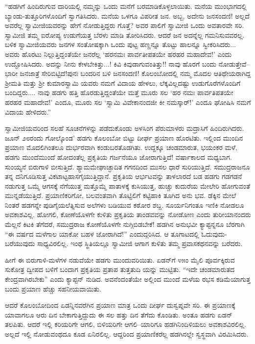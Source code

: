 “ಹಡಗಿಗೆ ಹಿಂದಿರುಗುವ ದಾರಿಯಲ್ಲಿ ನಮ್ಮನ್ನು ಒಂದು ಮನೆಗೆ ಬರಮಾಡಿಕೊಳ್ಳಲಾಯಿತು. ಮನೆಯ ಮುಂಭಾಗದಲ್ಲಿ ಬ್ಯಾಂಡು-ತುತ್ತೂರಿಗಳೊಂದಿಗೆ ಸ್ವಾಗತಿಸಿದರು. ಮನೆಯ ಒಳಗೂ ವಿಪರೀತ ಜನ. ಅಬ್ಬ, ಅದೇನು ಜನಸಂದಣಿ! ಅಲ್ಲದೆ ಅವರೆಲ್ಲ ಸ್ವಾಮೀಜಿಯವರನ್ನು ಹೇಗೆ ನೋಡುತ್ತಿದ್ದರು ಗೊತ್ತೆ? ಅವರ ಪಾಲಿಗೆ ಸ್ವಾಮೀಜಿ ಒಂದು ಅವತಾರವೇ ಸರಿ. ಸ್ವಾಮೀಜಿ ತಮ್ಮ ಐರೋಪ್ಯ ಉಡುಗೆಯತ್ತ ಬೆರಳು ಮಾಡಿ ತೋರಿಸಿದರು. ಆದರೆ ಜನ ಅದನ್ನೆಲ್ಲ ಗಮನಿಸುವವರಲ್ಲ. ಬಳಿಕ ಸ್ವಾಮೀಜಿಯವರು ಜನಗಳ ಸಂತೋಷಕ್ಕಾಗಿ ಒಂದು ಪುಟ್ಟ ಹಣ್ಣನ್ನೂ ತೊಟ್ಟು ಹಾಲನ್ನೂ ಸ್ವೀಕರಿಸಿದರು... ಅವರು ಹೊರಟು ನಿಲ್ಲುತ್ತಿದ್ದಂತೆಯೇ ಜನರೆಲ್ಲ ‘ಹರನಮಃ ಪಾರ್ವತೀಪತಯೇ ಹರಹರ ಮಹಾದೇವ!’ ಎಂದು ಉದ್ಘೋಷಿಸಿದರು. ಅದನ್ನು ನೀನು ಕೇಳಬೇಕಿತ್ತು...! ಕಿವಿ ಕಿವುಡಾಗುವಂತಿತ್ತು!! ನಾವು ಹೊರಗೆ ಬಂದು ನೋಡುತ್ತೇವೆ–ಭಾರೀ ಜನಜಾತ್ರೆ ಸೇರಿಬಿಟ್ಟಿದೆ!ಪುನಃ ಬಂದರಿನ ಬಳಿ ಜನಸಂದಣಿ! ಕೊಲಂಬೋದಲ್ಲಿ ನಮ್ಮ ಮೊದಲ ಆತಿಥೇಯರಾಗಿದ್ದ ಶ್ರೀಮತಿ ಮತ್ತು ಶ್ರೀ ಕುಮಾರಸ್ವಾಮಿ ಯವರು ನಮಗೆ ವಿದಾಯ ಹೇಳಲು, ಲೆಕ್ಕವಿಲ್ಲದಷ್ಟು ಉಡುಗೊರೆಗಳೊಂದಿಗೆ ಬಂದಿದ್ದರು.... ನಾವು ಹಡಗು ಹತ್ತಿ ಹೊರಡುತ್ತಿದ್ದಂತೆಯೇ ಮತ್ತೆ ಮೂರು ಸಲ ‘ಹರ ನಮಃ ಪಾರ್ವತಿಪತಯೇ ಹರಹರ ಮಹಾದೇವ!’ ಎಂದೂ, ಮೂರು ಸಲ ‘ಸ್ವಾಮಿ ವಿವೇಕಾನಂದಜೀ ಕೀ ನಮಸ್ಕಾರ್​!’ ಎಂದೂ ಘೋಷಿಸಿ ನಮಗೆ ವಿದಾಯ ಹೇಳಿದರು.”

ಸ್ವಾಮೀಜಿಯವರಿಂದ ಸಲಹೆ ಸೂಚನೆಗಳನ್ನು ಪಡೆದುಕೊಂಡು ಅಳಸಿಂಗ ಪೆರುಮಾಳರು ಮದ್ರಾಸಿಗೆ ಹಿಂದಿರುಗಿದರು. ಜೂನ್ ೨೮ರಂದು ಗೋಲ್ಕೊಂಡ’ ಹಡಗು ಕೊಲಂಬೋ ಬಿಟ್ಟು ದೀರ್ಘ ಪ್ರಯಾಣ ಹೊರಟಿತು. ಇಲ್ಲಿಂದ ಮುಂದಿನ ಪ್ರಯಾಣ ಮೊದಲಿಗಿಂತಲೂ ದುರ್ಭರವಾಗಿ ಕಂಡುಬರತೊಡಗಿತು. ಉದ್ದಕ್ಕೂ ಚಂಡಮಾರುತ, ಭಯಂಕರ ಮಳೆ, ಹಡಗು ಮುಂದೆಮುಂದೆ ಹೋದಂತೆಲ್ಲ ಪ್ರಕೃತಿಯ ಗರ್ಜನೆಯೂ ಜೋರಾಗುತ್ತಿದೆ! ವರ್ಷಾಕಾಲದ ಮಧ್ಯಬಾಗ. ಸುಂಯ್ಯನೆ ಬಿರುಗಾಳಿ ಬೀಸುತ್ತಿದೆ. ಶ್ಯಾಮಮೇಘಾಚ್ಛಾದಿತ ಗಗನದಿಂದ ಮುಸಲ ಧಾರೆ ಸುರಿಯುತ್ತಿದೆ. ಸಮುದ್ರರಾಜನೂ ತನ್ನ ದನಿಗೂಡಿಸುತ್ತ ವಿಕಟಾಟ್ಟಹಾಸಗೈಯುತ್ತಿದ್ದಾನೆ. ಪ್ರಕೃತಿಯ ಆರ್ಭಟವನ್ನು ತಾಳಲಾರದೆ ಬಡ ಹಡಗು ಗಡಗಡನೆ ನಡುಗುತ್ತ ಒಮ್ಮೆ ಆಗಸಕ್ಕೆ ನೆಗೆಯುತ್ತ ಮತ್ತೊಮ್ಮೆ ಪಾತಾಳಕ್ಕೆ ಕುಸಿಯುತ್ತ, ಹುಚ್ಚು ಕುದುರೆಯ ಮೇಲೇರಿ ಹೋಗುವಂತೆ ಮುನ್ನಡೆಯುತ್ತಿದೆ. ಪ್ರಯಾಣಿಕರಿಗೋ, ಬಲವಂತವಾಗಿ ತೊಟ್ಟಿಲಿಗೆ ಕಟ್ಟಿಹಾಕಿ ತೂಗಿದ ಅನು ಭವ. ಡೆಕ್ಕಿನ ಮೇಲೆ ನಿಂತರೆ ಹಡಗನ್ನೇ ಪುಡಿಗೈಯಲೆತ್ನಿಸುವ ಅಲೆಗಳು ಬಡಿಯುವ ಕಠೋರ ಶಬ್ದ. ಸೂರ್ಯನಿಗಂತೂ ಇಣಿಕಿ ನೋಡಲೂ ಅವಕಾಶವಿಲ್ಲ. ಹೋಗಲಿ, ಕೋಣೆಯೊಳಗೇ ಕುಳಿತು ಪ್ರಕೃತಿಯ ತಾಂಡವವನ್ನು ನೋಡೋಣ ಎಂದು ತುರೀಯಾನಂದರು ಮೆಲ್ಲನೆ ಕಿಟಕಿ ತೆಗೆದರೆ, ಸಮುದ್ರರಾಜ ಕೋಣೆಯೊಳಗೇ ನುಗ್ಗಿಬಿಡಬೇಕೆ! ಹಡಗಿನ ಅನುಭವೀ ಕ್ಯಾಪ್ಟನ್ನನೂ ಬೆರಗಾಗಿ “ಈ ವರ್ಷದ ಮಳೆಗಾಲ ಯಾಕೋ ಬಹಳ ಜೋರಾಗಿದೆ!” ಎಂದುದ್ಗರಿಸಿದ. ಆ ತೂಗಾಟದಲ್ಲಿ ಓದುವುದು-ಬರೆಯುವುದು ಸಾಧ್ಯವಿರಲಿಲ್ಲ. ಇಂಥ ಸ್ಥಿತಿಯಲ್ಲೂ ಸ್ವಾಮೀಜಿ ಆಗಾಗ ಕುಳಿತು ತಮ್ಮ ಪ್ರವಾಸಕಥನವನ್ನು ಬರೆದರು.

ಹೀಗೆ ಈ ಬಿರುಗಾಳಿ-ಮಳೆಗಳ ನಡುವೆಯೇ ಹಡಗು ಮುಂದುವರಿಯಿತು. ಏಡನ್​ಗೆ ೪೫ಂ ಮೈಲಿ ಪೂರ್ವಕ್ಕಿರುವ ಸುಕೋತ್ರ ದ್ವೀಪದ ಬಳಿಗೆ ಬಂದಾಗ ಪ್ರಕೃತಿಯ ಪ್ರತಾಪ ತುತ್ತತುದಿ ಯನ್ನು ಮುಟ್ಟಿತು. “ಇದೇ ಚಂಡಮಾರುತದ ಕೇಂದ್ರವಾಗಿರಬೇಕು” ಎಂದು ಕ್ಯಾಪ್ಟನ್ ನುಡಿದ. ಅವನೆಂದಂತೆಯೇ ಅಲ್ಲಿಂದ ಮುಂದೆ ಮಳೆಯ ರಭಸ ಕಡಿಮೆಯಾಗುತ್ತ ಬಂದು ಪ್ರಯಾಣ ಹೆಚ್ಚು ಸಹನೀಯವಾಯಿತು.

ಆದರೆ ಕೊಲಂಬೋದಿಂದ ಏಡನ್ನಿನವರೆಗಿನ ಪ್ರಯಾಣ ಮಾತ್ರ ಒಂದು ದೀರ್ಘ ದುಸ್ವಪ್ನವೇ ಸರಿ. ಈ ಪ್ರಯಾಣಕ್ಕೆ ಯಾವಾಗಲೂ ಆರು ದಿನ ಬೇಕಾಗುತ್ತಿದ್ದುದು ಈ ಸಲ ಹತ್ತು ದಿನ ತೆಗೆದು ಕೊಂಡಿತು. ಅಂತೂ ಹಡಗು ಏಡನ್ ತಲಪಿತು. ಆದರೆ ಇಲ್ಲಿ ಕರಿಯರಿಗೇ ಆಗಲಿ, ಬಿಳಿಯರಿಗೇ ಆಗಲಿ–ಯಾರಿಗೂ ಹಡಗಿನಿಂದಿಳಿಯಲು ಅವಕಾಶವಿರಲಿಲ್ಲ. ಅಲ್ಲದೆ ಇಲ್ಲಿ ನೋಡುವಂಥದೂ ಕೂಡ ಏನಿರಲಿಲ್ಲ. ಆದ್ದರಿಂದ ಪ್ರಯಾಣಿಕರೆಲ್ಲ ಹಡಗಿನಲ್ಲೇ ಸ್ವಸ್ಥವಾಗಿ ವಿರಮಿಸಿದರು.

